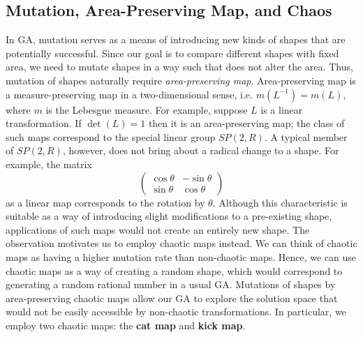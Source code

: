 \documentclass[12pt]{reedmcm}
\begin{document}
\subsection{Mutation, Area-Preserving Map, and Chaos}
In GA, mutation serves as a means of introducing new kinds of shapes that are potentially successful.
Since our goal is to compare different shapes with fixed area, we need to mutate shapes in a way such that does not alter the area.
Thus, mutation of shapes naturally require \textit{area-preserving map}.
Area-preserving map is a measure-preserving map in a two-dimensional sense, i.e. $m(L^{-1}) = m(L)$, where $m$ is the Lebesgue measure.
For example, suppose $L$ is a linear transformation.
If $\det(L) = 1$ then it is an area-preserving map; the class of such maps correspond to the special linear group $SP(2,R)$.
A typical member of $SP(2,R)$, however, does not bring about a radical change to a shape.
For example, the matrix
\begin{equation*}
\begin{pmatrix}
    \cos\theta & -\sin\theta  \\
    \sin\theta & \cos\theta  
  \end{pmatrix}
\end{equation*}
as a linear map corresponds to the rotation by $\theta$. 
Although this characteristic is suitable as a way of introducing slight modifications to a pre-existing shape, applications of such maps would not create an entirely new shape.
The observation motivates us to employ chaotic maps instead.
We can think of chaotic maps as having a higher mutation rate than non-chaotic maps.
Hence, we can use chaotic maps as a way of creating a random shape, which would correspond to generating a random rational number in a usual GA.
Mutations of shapes by area-preserving chaotic maps allow our GA to explore the solution space that would not be easily accessible by non-chaotic transformations.
In particular, we employ two chaotic maps: the \textbf{cat map} and \textbf{kick map}.
\end{document}
